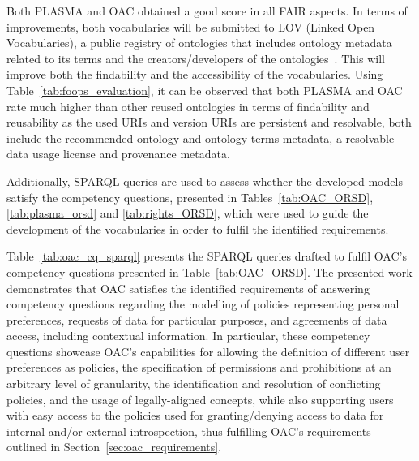 Both PLASMA and OAC obtained a good score in all FAIR aspects.
In terms of improvements, both vocabularies will be submitted to LOV (Linked Open Vocabularies), a public registry of ontologies that includes ontology metadata related to its terms and the creators/developers of the ontologies~\citep{dumontier_linked_2017}.
This will improve both the findability and the accessibility of the vocabularies.
Using Table~\ref{tab:foops_evaluation}, it can be observed that both PLASMA and OAC rate much higher than other reused ontologies in terms of findability and reusability as the used URIs and version URIs are persistent and resolvable, both include the recommended ontology and ontology terms metadata, a resolvable data usage license and provenance metadata.

Additionally, SPARQL queries are used to assess whether the developed models satisfy the competency questions, presented in Tables~\ref{tab:OAC_ORSD}, \ref{tab:plasma_orsd} and \ref{tab:rights_ORSD}, which were used to guide the development of the vocabularies in order to fulfil the identified requirements.

Table~\ref{tab:oac_cq_sparql} presents the SPARQL queries drafted to fulfil OAC's competency questions presented in Table~\ref{tab:OAC_ORSD}.
The presented work demonstrates that OAC satisfies the identified requirements of answering competency questions regarding the modelling of policies representing personal preferences, requests of data for particular purposes, and agreements of data access, including contextual information.
In particular, these competency questions showcase OAC's capabilities for allowing the definition of different user preferences as policies, the specification of permissions and prohibitions at an arbitrary level of granularity, the identification and resolution of conflicting policies, and the usage of legally-aligned concepts, while also supporting users with easy access to the policies used for granting/denying access to data for internal and/or external introspection, thus fulfilling OAC's requirements outlined in Section~\ref{sec:oac_requirements}.

